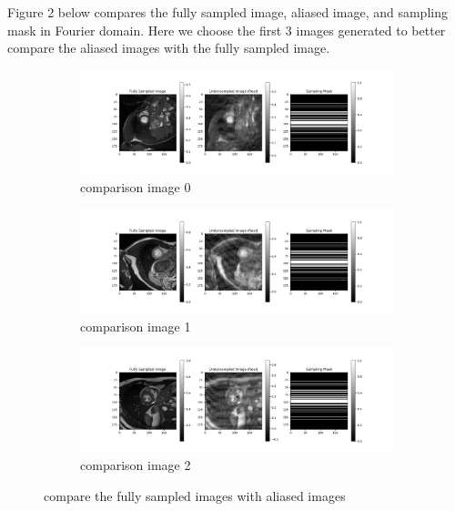 \documentclass{article}
\begin{document}
Figure 2 below compares the fully sampled image, aliased image, and sampling mask in Fourier domain.
Here we choose the first 3 images generated to better compare the aliased images with the fully sampled image.

\begin{figure}[ht]
  \centering
  \begin{subfigure}[b]{\linewidth}
    \includegraphics[width=\linewidth]{../assets/comparison_image_0.png}
    \caption{comparison image 0}
    \label{fig:comparison_image_0}
  \end{subfigure}
  \quad
  \begin{subfigure}[b]{\linewidth}
    \includegraphics[width=\linewidth]{../assets/comparison_image_1.png}
    \caption{comparison image 1}
    \label{fig:comparison_image_1}
  \end{subfigure}
  \quad
  \begin{subfigure}[b]{\linewidth}
    \includegraphics[width=\linewidth]{../assets/comparison_image_2.png}
    \caption{comparison image 2}
    \label{fig:comparison_image_2}
  \end{subfigure}
  \caption{compare the fully sampled images with aliased images}
\end{figure}
\end{document}
